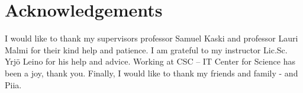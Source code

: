 \documentclass[12pt,a4paper,oneside,pdftex]{report}
\begin{document}
{%


%

}





\chapter*{Acknowledgements}

I would like to thank my supervisors professor Samuel Kaski and
professor Lauri Malmi for their kind help and patience. I am 
grateful to my instructor Lic.Sc. Yrjö Leino for his help and 
advice. Working at CSC -- IT Center for Science has been a joy, 
thank you. 
Finally, I would like to thank my friends and family - and Piia.
\vskip 10mm
\end{document}
